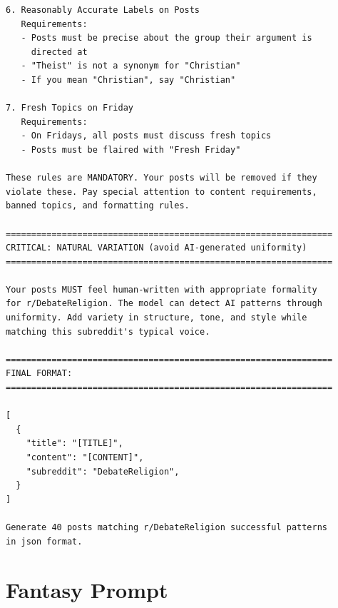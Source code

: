 \begin{small}
\begin{verbatim}
6. Reasonably Accurate Labels on Posts
   Requirements:
   - Posts must be precise about the group their argument is 
     directed at
   - "Theist" is not a synonym for "Christian"
   - If you mean "Christian", say "Christian"

7. Fresh Topics on Friday
   Requirements:
   - On Fridays, all posts must discuss fresh topics
   - Posts must be flaired with "Fresh Friday"

These rules are MANDATORY. Your posts will be removed if they 
violate these. Pay special attention to content requirements, 
banned topics, and formatting rules.

================================================================
CRITICAL: NATURAL VARIATION (avoid AI-generated uniformity)
================================================================

Your posts MUST feel human-written with appropriate formality 
for r/DebateReligion. The model can detect AI patterns through 
uniformity. Add variety in structure, tone, and style while 
matching this subreddit's typical voice.

================================================================
FINAL FORMAT:
================================================================

[
  {
    "title": "[TITLE]",
    "content": "[CONTENT]",
    "subreddit": "DebateReligion",
  }
]

Generate 40 posts matching r/DebateReligion successful patterns 
in json format.
\end{verbatim}
\end{small}

\section{Fantasy Prompt}

